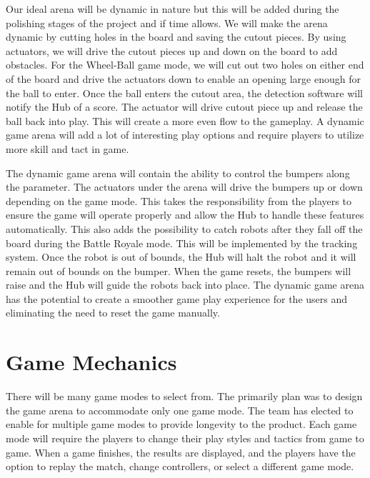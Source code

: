 \documentclass[11pt]{ieeeconf}
\begin{document}
Our ideal arena will be dynamic in nature but this will be added during the polishing stages of the project and if time allows. We will make the arena dynamic by cutting holes in the board and saving the cutout pieces. By using actuators, we will drive the cutout pieces up and down on the board to add obstacles. For the Wheel-Ball game mode, we will cut out two holes on either end of the board and drive the actuators down to enable an opening large enough for the ball to enter. Once the ball enters the cutout area, the detection software will notify the Hub of a score. The actuator will drive cutout piece up and release the ball back into play. This will create a more even flow to the gameplay. A dynamic game arena will add a lot of interesting play options and require players to utilize more skill and tact in game.

The dynamic game arena will contain the ability to control the bumpers along the parameter. The actuators under the arena will drive the bumpers up or down depending on the game mode. This takes the responsibility from the players to ensure the game will operate properly and allow the Hub to handle these features automatically. This also adds the possibility to catch robots after they fall off the board during the Battle Royale mode. This will be implemented by the tracking system. Once the robot is out of bounds, the Hub will halt the robot and it will remain out of bounds on the bumper. When the game resets, the bumpers will raise and the Hub will guide the robots back into place. The dynamic game arena has the potential to create a smoother game play experience for the users and eliminating the need to reset the game manually. 

\section{Game Mechanics}

There will be many game modes to select from. The primarily plan was to design the game arena to accommodate only one game mode. The team has elected to enable for multiple game modes to provide longevity to the product. Each game mode will require the players to change their play styles and tactics from game to game. When a game finishes, the results are displayed, and the players have the option to replay the match, change controllers, or select a different game mode.
\end{document}
